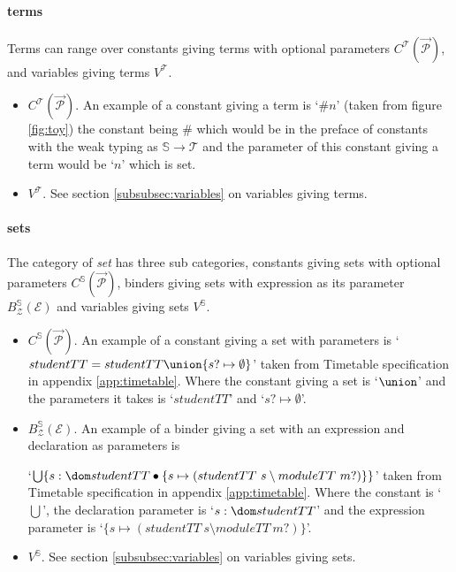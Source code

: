 \paragraph{terms}
\label{subsubsec:terms}

Terms can range over constants giving terms with optional parameters $C^{\mathcal{T}}(\overrightarrow{\mathcal{P}})$, and variables giving terms $V^{\mathcal{T}}$.

\begin{itemize}
\item $C^{\mathcal{T}}(\overrightarrow{\mathcal{P}})$. An example of a constant giving a term is `$\# n$' (taken from figure \ref{fig:toy}) the constant being $\#$ which would be in the preface of constants with the weak typing as $\mathbb{S} \rightarrow \mathcal{T}$ and the parameter of this constant giving a term would be `$n$' which is set.

\item $V^{\mathcal{T}}$. See section \ref{subsubsec:variables} on variables giving terms.
\end{itemize}

\paragraph{sets}
\label{subsubsec:sets}

The category of \emph{set} has three sub categories, constants giving sets with optional parameters $C^{\mathbb{S}}(\overrightarrow{\mathcal{P}})$, binders giving sets with expression as its parameter $B^{\mathbb{S}}_{\mathcal{Z}}(\mathcal{E})$ and variables giving sets $V^{\mathbb{S}}$.

\begin{itemize}
\item $C^{\mathbb{S}}(\overrightarrow{\mathcal{P}})$. An example of a constant giving a set with parameters is
\newline
`$studentTT = studentTT \union {s? \mapsto \emptyset}$'
\newline
taken from Timetable specification in appendix \ref{app:timetable}. Where the constant giving a set is `$\union$' and the parameters it takes is `$studentTT$' and `${s? \mapsto \emptyset}$'.

\item $B^{\mathbb{S}}_{\mathcal{Z}}(\mathcal{E})$. An example of a binder giving a set with an expression and declaration as parameters is
\newline

`$\bigcup \{s:\dom studentTT \bullet \{s \mapsto (studentTT~s \setminus moduleTT~m?)\}\}$' \newline
taken from Timetable specification in appendix \ref{app:timetable}. Where the constant is `$\bigcup$', the declaration parameter is `$s:\dom studentTT $' and the expression parameter is `$  \{s \mapsto (studentTT~s \setminus moduleTT~m?)\}$'.

\item $V^{\mathbb{S}}$. See section \ref{subsubsec:variables} on variables giving sets.
\end{itemize}

